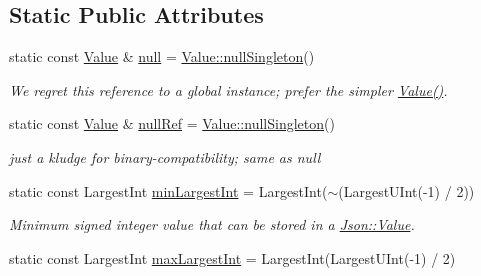 \subsection*{Static Public Attributes}
\begin{DoxyCompactItemize}
\item 
static const \hyperlink{classJson_1_1Value}{Value} \& \hyperlink{classJson_1_1Value_a9736edcb8e64d7d50fe6b3bd3e52bfe9}{null} = \hyperlink{classJson_1_1Value_a1c8d09e24220363c6f07c3af7ffa72b2}{Value\+::null\+Singleton}()\hypertarget{classJson_1_1Value_a9736edcb8e64d7d50fe6b3bd3e52bfe9}{}\label{classJson_1_1Value_a9736edcb8e64d7d50fe6b3bd3e52bfe9}

\begin{DoxyCompactList}\small\item\em We regret this reference to a global instance; prefer the simpler \hyperlink{classJson_1_1Value_ada6ba1369448fb0240bccc36efaa46f7}{Value()}. \end{DoxyCompactList}\item 
static const \hyperlink{classJson_1_1Value}{Value} \& \hyperlink{classJson_1_1Value_a5a0b0c453769835eb70263dc6380776c}{null\+Ref} = \hyperlink{classJson_1_1Value_a1c8d09e24220363c6f07c3af7ffa72b2}{Value\+::null\+Singleton}()\hypertarget{classJson_1_1Value_a5a0b0c453769835eb70263dc6380776c}{}\label{classJson_1_1Value_a5a0b0c453769835eb70263dc6380776c}

\begin{DoxyCompactList}\small\item\em just a kludge for binary-\/compatibility; same as null \end{DoxyCompactList}\item 
static const Largest\+Int \hyperlink{classJson_1_1Value_af91df130daa50dd43d2cd89e6ee67706}{min\+Largest\+Int} = Largest\+Int($\sim$(Largest\+U\+Int(-\/1) / 2))\hypertarget{classJson_1_1Value_af91df130daa50dd43d2cd89e6ee67706}{}\label{classJson_1_1Value_af91df130daa50dd43d2cd89e6ee67706}

\begin{DoxyCompactList}\small\item\em Minimum signed integer value that can be stored in a \hyperlink{classJson_1_1Value}{Json\+::\+Value}. \end{DoxyCompactList}\item 
static const Largest\+Int \hyperlink{classJson_1_1Value_a8b4977696f13296fa8755c7953fafb2f}{max\+Largest\+Int} = Largest\+Int(Largest\+U\+Int(-\/1) / 2)\hypertarget{classJson_1_1Value_a8b4977696f13296fa8755c7953fafb2f}{}\label{classJson_1_1Value_a8b4977696f13296fa8755c7953fafb2f}


\end{DoxyCompactItemize}
